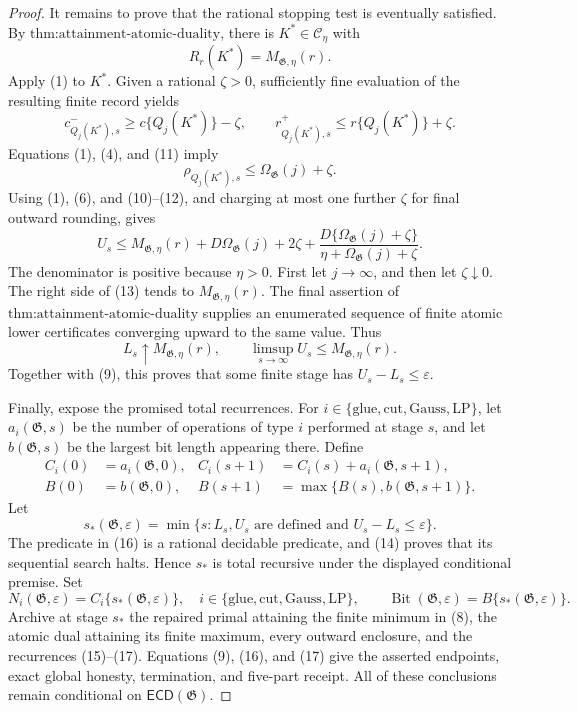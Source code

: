 \documentclass{article}
\begin{document}
\begin{proof}
It remains to prove that the rational stopping test is eventually satisfied.  By \(\text{thm:attainment-atomic-duality}\), there is \(K^*\in\mathcal C_\eta\) with
\[
 R_r(K^*)=M_{\mathfrak G,\eta}(r).
 \tag{10}
\]
Apply (1) to \(K^*\).  Given a rational \(\zeta>0\), sufficiently fine evaluation of the resulting finite record yields
\[
 c^-_{Q_j(K^*),s}\ge c\{Q_j(K^*)\}-\zeta,
 \qquad
 r^+_{Q_j(K^*),s}\le r\{Q_j(K^*)\}+\zeta.
 \tag{11}
\]
Equations (1), (4), and (11) imply
\[
 \rho_{Q_j(K^*),s}\le\Omega_{\mathfrak G}(j)+\zeta.
 \tag{12}
\]
Using (1), (6), and (10)--(12), and charging at most one further \(\zeta\) for final outward rounding, gives
\[
 U_s\le M_{\mathfrak G,\eta}(r)
 +D\Omega_{\mathfrak G}(j)+2\zeta
 +\frac{D\{\Omega_{\mathfrak G}(j)+\zeta\}}
 {\eta+\Omega_{\mathfrak G}(j)+\zeta}.
 \tag{13}
\]
The denominator is positive because \(\eta>0\).  First let \(j\to\infty\), and then let \(\zeta\downarrow0\).  The right side of (13) tends to \(M_{\mathfrak G,\eta}(r)\).  The final assertion of \(\text{thm:attainment-atomic-duality}\) supplies an enumerated sequence of finite atomic lower certificates converging upward to the same value.  Thus
\[
 L_s\uparrow M_{\mathfrak G,\eta}(r),
 \qquad
 \limsup_{s\to\infty}U_s\le M_{\mathfrak G,\eta}(r).
 \tag{14}
\]
Together with (9), this proves that some finite stage has \(U_s-L_s\le\varepsilon\).

Finally, expose the promised total recurrences.  For \(i\in\{\mathrm{glue},\mathrm{cut},\mathrm{Gauss},\mathrm{LP}\}\), let \(a_i(\mathfrak G,s)\) be the number of operations of type \(i\) performed at stage \(s\), and let \(b(\mathfrak G,s)\) be the largest bit length appearing there.  Define
\[
 \begin{aligned}
 C_i(0)&=a_i(\mathfrak G,0),&
 C_i(s+1)&=C_i(s)+a_i(\mathfrak G,s+1),\\
 B(0)&=b(\mathfrak G,0),&
 B(s+1)&=\max\{B(s),b(\mathfrak G,s+1)\}.
 \end{aligned}
 \tag{15}
\]
Let
\[
 s_*(\mathfrak G,\varepsilon)
 =\min\{s:L_s,U_s\text{ are defined and }U_s-L_s\le\varepsilon\}.
 \tag{16}
\]
The predicate in (16) is a rational decidable predicate, and (14) proves that its sequential search halts.  Hence \(s_*\) is total recursive under the displayed conditional premise.  Set
\[
 N_i(\mathfrak G,\varepsilon)=C_i\{s_*(\mathfrak G,\varepsilon)\},
 \quad i\in\{\mathrm{glue},\mathrm{cut},\mathrm{Gauss},\mathrm{LP}\},
 \qquad
 \operatorname{Bit}(\mathfrak G,\varepsilon)=B\{s_*(\mathfrak G,\varepsilon)\}.
 \tag{17}
\]
Archive at stage \(s_*\) the repaired primal attaining the finite minimum in (8), the atomic dual attaining its finite maximum, every outward enclosure, and the recurrences (15)--(17).  Equations (9), (16), and (17) give the asserted endpoints, exact global honesty, termination, and five-part receipt.  All of these conclusions remain conditional on \(\mathsf{ECD}(\mathfrak G)\).
\end{proof}
\end{document}
